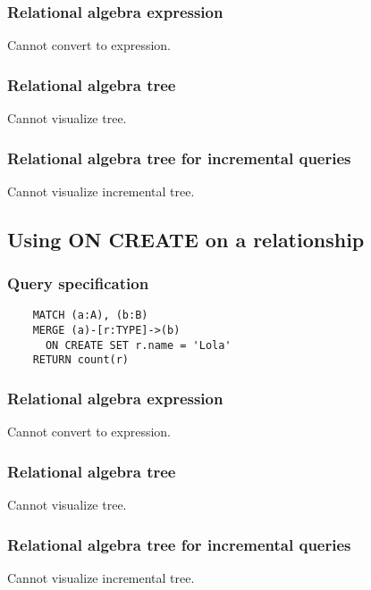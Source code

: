 	\subsubsection*{Relational algebra expression}

	Cannot convert to expression.

	\subsubsection*{Relational algebra tree}

	Cannot visualize tree.

	\subsubsection*{Relational algebra tree for incremental queries}

	Cannot visualize incremental tree.
	\subsection{Using ON CREATE on a relationship}

	\subsubsection*{Query specification}

	\begin{lstlisting}
	MATCH (a:A), (b:B)
	MERGE (a)-[r:TYPE]->(b)
	  ON CREATE SET r.name = 'Lola'
	RETURN count(r)
	\end{lstlisting}


	\subsubsection*{Relational algebra expression}

	Cannot convert to expression.

	\subsubsection*{Relational algebra tree}

	Cannot visualize tree.

	\subsubsection*{Relational algebra tree for incremental queries}

	Cannot visualize incremental tree.
